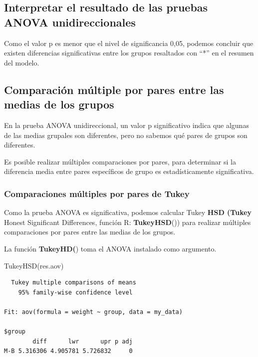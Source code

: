 \documentclass[
  letterpaper,
  DIV=11,
  numbers=noendperiod]{scrartcl}
\newenvironment{Shaded}{\begin{snugshade}}{\end{snugshade}}
\newcommand{\FunctionTok}[1]{\textcolor[rgb]{0.28,0.35,0.67}{#1}}
\newcommand{\NormalTok}[1]{\textcolor[rgb]{0.00,0.23,0.31}{#1}}
\begin{document}
\hypertarget{interpretar-el-resultado-de-las-pruebas-anova-unidireccionales}{%
\subsection{Interpretar el resultado de las pruebas ANOVA
unidireccionales}\label{interpretar-el-resultado-de-las-pruebas-anova-unidireccionales}}

Como el valor p es menor que el nivel de significancia 0,05, podemos
concluir que existen diferencias significativas entre los grupos
resaltados con ``*'' en el resumen del modelo.

\hypertarget{comparaciuxf3n-muxfaltiple-por-pares-entre-las-medias-de-los-grupos}{%
\subsection{Comparación múltiple por pares entre las medias de los
grupos}\label{comparaciuxf3n-muxfaltiple-por-pares-entre-las-medias-de-los-grupos}}

En la prueba ANOVA unidireccional, un valor p significativo indica que
algunas de las medias grupales son diferentes, pero no sabemos qué pares
de grupos son diferentes.

Es posible realizar múltiples comparaciones por pares, para determinar
si la diferencia media entre pares específicos de grupo es
estadísticamente significativa.

\hypertarget{comparaciones-muxfaltiples-por-pares-de-tukey}{%
\subsubsection{Comparaciones múltiples por pares de
Tukey}\label{comparaciones-muxfaltiples-por-pares-de-tukey}}

Como la prueba ANOVA es significativa, podemos calcular Tukey
\textbf{HSD (Tukey} Honest Significant Differences, función R:
\textbf{TukeyHSD}()) para realizar múltiples comparaciones por pares
entre las medias de los grupos.

La función \textbf{TukeyHD(}) toma el ANOVA instalado como argumento.

\begin{Shaded}
\begin{Highlighting}[]
\FunctionTok{TukeyHSD}\NormalTok{(res.aov)}
\end{Highlighting}
\end{Shaded}

\begin{verbatim}
  Tukey multiple comparisons of means
    95% family-wise confidence level

Fit: aov(formula = weight ~ group, data = my_data)

$group
        diff      lwr      upr p adj
M-B 5.316306 4.905781 5.726832     0
\end{verbatim}
\end{document}

